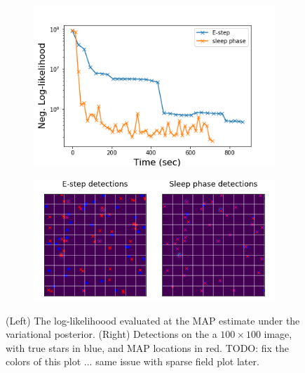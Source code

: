 \begin{figure}[!htb]
    \centering
    \begin{subfigure}[!t]{0.4\textwidth}
    \centering
    \includegraphics[width=\textwidth]{figures/optim_path_compare_100x100.png}
    \end{subfigure}
    \begin{subfigure}[!t]{0.59\textwidth}
    \centering
    \includegraphics[width=\textwidth]{figures/optim_path_detect_compare_100x100.png}
    \end{subfigure}
    \caption{(Left) The log-likelihoood evaluated at the MAP estimate under the variational posterior. (Right) Detections on the a $100\times 100$ image, with true stars in blue, and MAP locations in red. TODO: fix the colors of this plot ... same issue with sparse field plot later.}
    \label{fig:sim_data100x100}
\end{figure}
